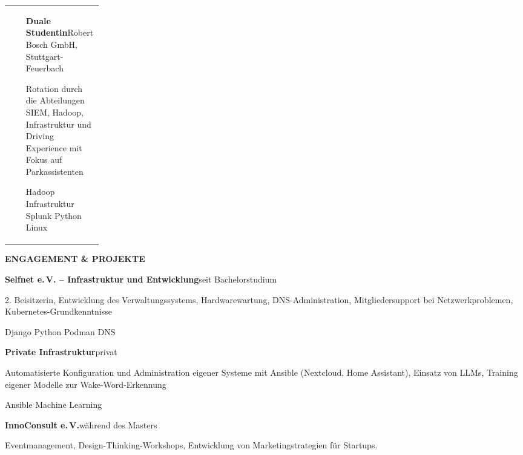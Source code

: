 \documentclass[10pt,a4paper]{article}
\makeatletter
\newcommand{\mainsection}[1]{%
  \vspace{2mm}%
  {\large\bfseries\textcolor{CVPrimary}{\MakeUppercase{#1}}}\par
  \vspace{0.8mm}{\color{CVRule}\rule{\linewidth}{0.6pt}}\vspace{1.2mm}
}
\newcommand{\entry}[4]{%
  \begin{tabularx}{\linewidth}{@{}>{\raggedright\arraybackslash}p{0.18\linewidth}@{\hspace{2.5mm}}X@{}}
    {\small\textcolor{CVMuted}{#1}} &
    {\bfseries #2}\hfill{\small\textcolor{CVMuted}{#3}}\par
    #4
  \end{tabularx}\vspace{1.2mm}
}
\newcommand{\compactentry}[3]{%
  {\bfseries #1}\hfill{\small\textcolor{CVMuted}{#2}}\par
  #3\par\vspace{1.7mm}
}
\newcommand{\tag}[1]{%
  \begingroup
  \setlength{\fboxsep}{1.4pt}%
  \colorbox{CVSoft}{\scriptsize\textcolor{CVPrimary}{#1}}%
  \endgroup\hspace{0.7mm}%
}
\makeatother
\begin{document}
\begin{minipage}[t]{0.68\textwidth}
  \entry{10/2021--09/2024}{Duale Studentin}{Robert Bosch GmbH, Stuttgart-Feuerbach}{
    Rotation durch die Abteilungen SIEM, Hadoop, Infrastruktur und Driving Experience mit Fokus auf
    Parkassistenten\par
    \tag{Hadoop}\tag{Infrastruktur}\tag{Splunk}\tag{Python}\tag{Linux}
  }

  \mainsection{Engagement \& Projekte}

  \compactentry{Selfnet e.\,V. -- Infrastruktur und Entwicklung}{seit Bachelorstudium}{
    2. Beisitzerin, Entwicklung des Verwaltungssystems, Hardwarewartung,
    DNS-Administration, Mitgliedersupport bei Netzwerkproblemen,
    Kubernetes-Grundkenntnisse\par
    \tag{Django}\tag{Python}\tag{Podman}\tag{DNS}
  }

  \compactentry{Private Infrastruktur}{privat}{
    Automatisierte Konfiguration und Administration eigener Systeme mit Ansible
    (Nextcloud, Home Assistant), Einsatz von LLMs, Training eigener
    Modelle zur Wake-Word-Erkennung\par
    \tag{Ansible}\tag{Machine Learning}
  }

  \compactentry{InnoConsult e.\,V.}{während des Masters}{
    Eventmanagement, Design-Thinking-Workshops, Entwicklung von Marketingstrategien für Startups.
  }
\end{minipage}
\end{document}
